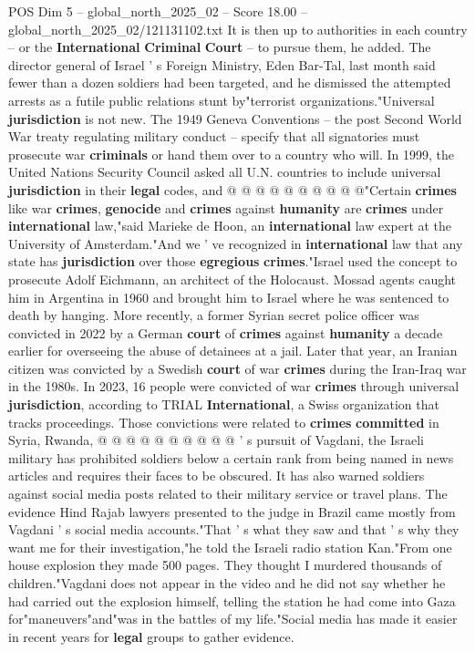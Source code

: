\begin{textsample}{POS Dim 5 – global\_north\_2025\_02 – Score 18.00 – global\_north\_2025\_02/121131102.txt}
It is then up to authorities in each country -- or the \textbf{International} \textbf{Criminal} \textbf{Court} -- to pursue them, he added.
The director general of Israel ' s Foreign Ministry, Eden Bar-Tal, last month said fewer than a dozen soldiers had been targeted, and he dismissed the attempted arrests as a futile public relations stunt by"terrorist organizations."Universal \textbf{jurisdiction} is not new.
The 1949 Geneva Conventions -- the post Second World War treaty regulating military conduct -- specify that all signatories must prosecute war \textbf{criminals} or hand them over to a country who will.
In 1999, the United Nations Security Council asked all U.N. countries to include universal \textbf{jurisdiction} in their \textbf{legal} codes, and @ @ @ @ @ @ @ @ @ @"Certain \textbf{crimes} like war \textbf{crimes}, \textbf{genocide} and \textbf{crimes} against \textbf{humanity} are \textbf{crimes} under \textbf{international} law,"said Marieke de Hoon, an \textbf{international} law expert at the University of Amsterdam."And we ' ve recognized in \textbf{international} law that any state has \textbf{jurisdiction} over those \textbf{egregious} \textbf{crimes}."Israel used the concept to prosecute Adolf Eichmann, an architect of the Holocaust.
Mossad agents caught him in Argentina in 1960 and brought him to Israel where he was sentenced to death by hanging.
More recently, a former Syrian secret police officer was convicted in 2022 by a German \textbf{court} of \textbf{crimes} against \textbf{humanity} a decade earlier for overseeing the abuse of detainees at a jail.
Later that year, an Iranian citizen was convicted by a Swedish \textbf{court} of war \textbf{crimes} during the Iran-Iraq war in the 1980s.
In 2023, 16 people were convicted of war \textbf{crimes} through universal \textbf{jurisdiction}, according to TRIAL \textbf{International}, a Swiss organization that tracks proceedings.
Those convictions were related to \textbf{crimes} \textbf{committed} in Syria, Rwanda, @ @ @ @ @ @ @ @ @ @ ' s pursuit of Vagdani, the Israeli military has prohibited soldiers below a certain rank from being named in news articles and requires their faces to be obscured.
It has also warned soldiers against social media posts related to their military service or travel plans.
The evidence Hind Rajab lawyers presented to the judge in Brazil came mostly from Vagdani ' s social media accounts."That ' s what they saw and that ' s why they want me for their investigation,"he told the Israeli radio station Kan."From one house explosion they made 500 pages.
They thought I murdered thousands of children."Vagdani does not appear in the video and he did not say whether he had carried out the explosion himself, telling the station he had come into Gaza for"maneuvers"and"was in the battles of my life."Social media has made it easier in recent years for \textbf{legal} groups to gather evidence.

\end{textsample}
